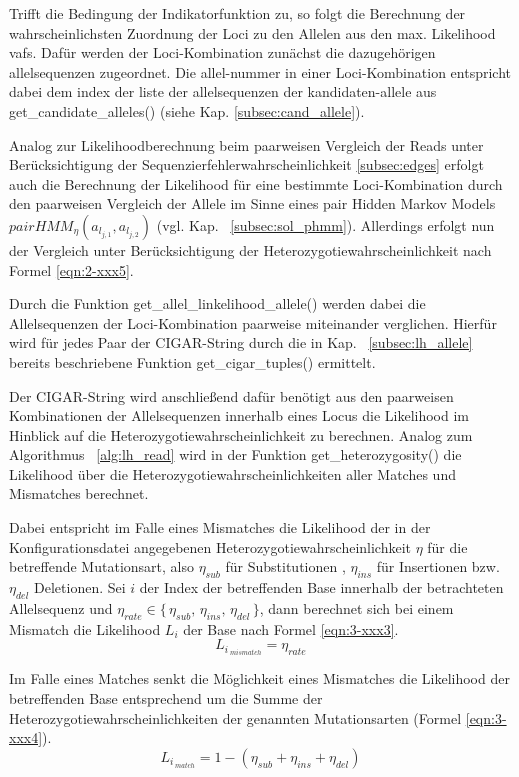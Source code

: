 Trifft die Bedingung der Indikatorfunktion zu, so folgt die Berechnung der wahrscheinlichsten Zuordnung der Loci zu den Allelen aus den max. Likelihood vafs. Dafür werden der Loci-Kombination zunächst die dazugehörigen allelsequenzen zugeordnet. Die allel-nummer in einer Loci-Kombination entspricht dabei dem index der liste der allelsequenzen der kandidaten-allele aus get\_candidate\_alleles() (siehe Kap. \ref{subsec:cand_allele}).

Analog zur Likelihoodberechnung beim paarweisen Vergleich der Reads unter Berücksichtigung der Sequenzierfehlerwahrscheinlichkeit \ref{subsec:edges} erfolgt auch die Berechnung der Likelihood für eine bestimmte Loci-Kombination durch den paarweisen Vergleich der Allele im Sinne eines pair Hidden Markov Models $ pairHMM_{\eta}(a_{l_{j,1}}, a_{l_{j,2}}) $ (vgl. Kap. ~\ref{subsec:sol_phmm}). Allerdings erfolgt nun der Vergleich unter Berücksichtigung der Heterozygotiewahrscheinlichkeit nach Formel \eqref{eqn:2-xxx5}. 

Durch die Funktion get\_allel\_linkelihood\_allele() werden dabei die Allelsequenzen der Loci-Kombination paarweise miteinander verglichen. Hierfür wird für jedes Paar der CIGAR-String durch die in Kap. ~\ref{subsec:lh_allele} bereits beschriebene Funktion get\_cigar\_tuples() ermittelt.

Der CIGAR-String wird anschließend dafür benötigt aus den paarweisen Kombinationen der Allelsequenzen innerhalb eines Locus die Likelihood im Hinblick auf die Heterozygotiewahrscheinlichkeit zu berechnen. Analog zum Algorithmus ~\ref{alg:lh_read} wird in der Funktion  get\_heterozygosity() die Likelihood über die Heterozygotiewahrscheinlichkeiten aller Matches und Mismatches berechnet.

Dabei entspricht im Falle eines Mismatches die Likelihood der in der Konfigurationsdatei angegebenen Heterozygotiewahrscheinlichkeit $ \eta $ für die betreffende Mutationsart, also $ \eta_{sub} $ für Substitutionen , $ \eta_{ins} $ für Insertionen bzw. $ \eta_{del} $ Deletionen. Sei $i$ der Index der betreffenden Base innerhalb der betrachteten Allelsequenz und $ \eta_{rate} \in \{\,\eta_{sub},\, \eta_{ins},\, \eta_{del}\,\}$, dann berechnet sich bei einem Mismatch die Likelihood $L_{i}$ der Base nach Formel \eqref{eqn:3-xxx3}.
\begin{equation} \label{eqn:3-xxx3}
\tag{3-xxx3}
L_{i\,_{mismatch}} = \eta_{rate}
\end{equation}

Im Falle eines Matches senkt die Möglichkeit eines Mismatches die Likelihood der betreffenden Base entsprechend um die Summe der Heterozygotiewahrscheinlichkeiten der genannten Mutationsarten (Formel \eqref{eqn:3-xxx4}).
\begin{equation} \label{eqn:3-xxx4}
\tag{3-xxx4}
L_{i\,_{match}} = 1 - (\eta_{sub} + \eta_{ins} + \eta_{del})
\end{equation}

